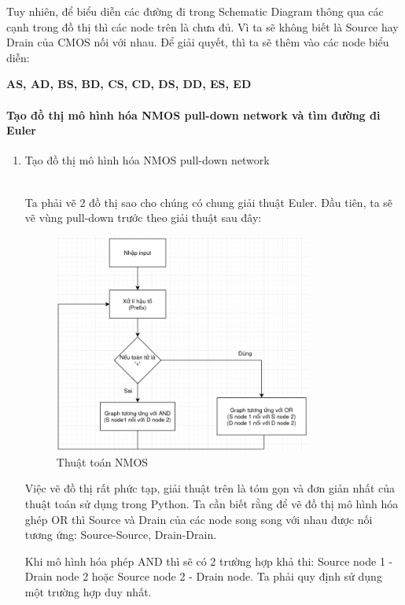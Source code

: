\documentclass[a4paper,12pt]{article}
\begin{document}
Tuy nhiên, để biểu diễn các đường đi trong Schematic Diagram thông qua các cạnh trong 
đồ thị thì các node trên là chưa đủ. Vì ta sẽ không biết là Source hay Drain của CMOS
nối với nhau. Để giải quyết, thì ta sẽ thêm vào các node biểu diễn:
\begin{center}
\textbf{AS, AD, BS, BD, CS, CD, DS, DD, ES, ED}
\end{center}
\paragraph{Tạo đồ thị mô hình hóa NMOS pull-down network và tìm đường đi Euler}
\begin{enumerate}[label=\alph*.]
    \item{Tạo đồ thị mô hình hóa NMOS pull-down network}
    \\
Ta phải vẽ 2 đồ thị sao cho chúng có chung giải thuật Euler. Đầu tiên, 
ta sẽ vẽ vùng pull-down trước theo giải thuật sau đây:
    \begin{figure}[H]
        \centering
        \includegraphics[width=0.8\textwidth]{../PNG/Algorithm_NMOS.png}
        \caption{Thuật toán NMOS}
        \label{fig: NMOSAlgorithms}
    \end{figure}
Việc vẽ đồ thị rất phức tạp, giải thuật trên là tóm gọn và đơn giản nhất của thuật
toán sử dụng trong Python. Ta cần biết rằng để vẽ đồ thị mô hình hóa ghép OR
thì Source và Drain của các node song song với nhau được nối tương ứng: Source-Source,
Drain-Drain.

Khi mô hình hóa phép AND thì sẽ có 2 trường hợp khả thi: Source node 1 - Drain node 2 
hoặc Source node 2 - Drain node. Ta phải quy định sử dụng một trường hợp duy nhất.


\end{enumerate}
\end{document}
